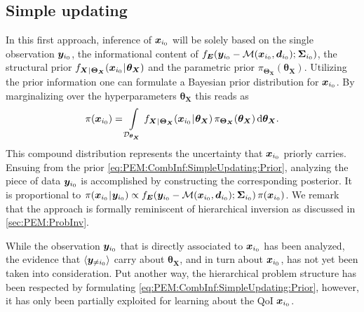 \subsection{Simple updating} \label{sec:PEM:CombInf:SimpleUpdating}
In this first approach, inference of \(\bm{x}_{i_0}\) will be solely based on the single observation \(\bm{y}_{i_0}\),
the informational content of \(f_{\bm{E}} (\bm{y}_{i_0}-\mathcal{M}(\bm{x}_{i_0},\bm{d}_{i_0}) ;{\:\!} \bm{\Sigma}_{i_0})\),
the structural prior \(f_{\bm{X} {\:\!}|{\:\!} \bm{\Theta}_{\bm{X}}} (\bm{x}_{i_0} {\:\!}|{\:\!} \bm{\theta}_{\bm{X}})\) and the parametric prior \(\pi_{\bm{\Theta}_{\bm{X}}} (\bm{\theta}_{\bm{X}})\).
Utilizing the prior information one can formulate a Bayesian prior distribution for \(\bm{x}_{i_0}\).
By marginalizing over the hyperparameters \(\bm{\theta}_{\bm{X}}\) this reads as
\begin{equation} \label{eq:PEM:CombInf:SimpleUpdating:Prior}
  \pi(\bm{x}_{i_0}) = \int\limits_{\mathcal{D}_{\bm{\theta}_{\bm{X}}}}
  f_{\bm{X} {\:\!}|{\:\!} \bm{\Theta}_{\bm{X}}} (\bm{x}_{i_0} {\:\!}|{\:\!} \bm{\theta}_{\bm{X}}) \, \pi_{\bm{\Theta}_{\bm{X}}}(\bm{\theta}_{\bm{X}}) \, \mathrm{d} \bm{\theta}_{\bm{X}}.
\end{equation}
This compound distribution represents the uncertainty that \(\bm{x}_{i_0}\) priorly carries.
Ensuing from the prior \cref{eq:PEM:CombInf:SimpleUpdating:Prior}, analyzing the piece of data \(\bm{y}_{i_0}\) is accomplished by constructing the corresponding posterior.
It is proportional to \(\pi(\bm{x}_{i_0} {\:\!}|{\:\!} \bm{y}_{i_0}) \propto f_{\bm{E}} ( \bm{y}_{i_0}-\mathcal{M}(\bm{x}_{i_0},\bm{d}_{i_0}) ;{\:\!} \bm{\Sigma}_{i_0} ) \, \pi(\bm{x}_{i_0})\).
We remark that the approach is formally reminiscent of hierarchical inversion as discussed in \cref{sec:PEM:ProbInv}.
\par %
While the observation \(\bm{y}_{i_0}\) that is directly associated to \(\bm{x}_{i_0}\) has been analyzed,
the evidence that \(\langle{\bm{y}_{\neq i_0}}\rangle\) carry about \(\bm{\theta}_{\bm{X}}\), and in turn about \(\bm{x}_{i_0}\), has not yet been taken into consideration.
Put another way, the hierarchical problem structure has been respected by formulating \cref{eq:PEM:CombInf:SimpleUpdating:Prior}, however, it has only been partially exploited for learning about the QoI \(\bm{x}_{i_0}\).

